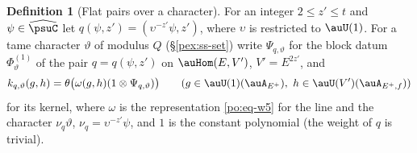 \documentclass[10pt]{amsart}
\theoremstyle{definition}
\newtheorem{definition}[theorem]{Definition}
\theoremstyle{remark}
\begin{document}
\begin{definition}[Flat pairs over a character]\label{psu:def-flat}
For an integer $2\le z'\le t$ and $\psi\in\widehat\psuC$ let $q(\psi,z')=(\upsilon^{-z'}\psi,z')$,
where $\upsilon$ is restricted to $\auU(1)$. For a tame character $\vartheta$ of modulus $Q$
(\S\ref{pex:ss-set}) write $\Psi_{q,\vartheta}$ for the block datum $\Phi^{(1)}_\vartheta$ of the pair
$q=q(\psi,z')$ on $\auHom(E,V')$, $V'=E^{2z'}$, and
\[
k_{q,\vartheta}(g,h)=\theta\bigl(\omega(g,h)(1\otimes\Psi_{q,\vartheta})\bigr)\qquad(g\in\auU(1)(\auA_{E^+}),
\ h\in\auU(V')(\auA_{E^+,f}))
\]
for its kernel, where $\omega$ is the representation \eqref{po:eq-w5} for the line and the character
$\nu_q\vartheta$, $\nu_q=\upsilon^{-z'}\psi$, and $1$ is the constant polynomial (the weight of $q$
is trivial).
\end{definition}
\end{document}
